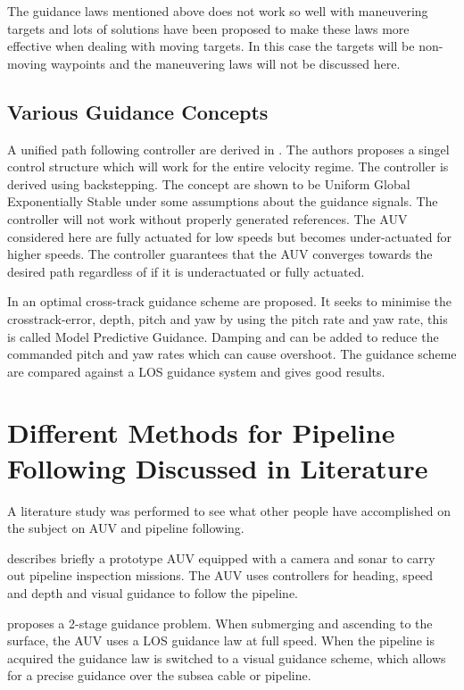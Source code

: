         	The guidance laws mentioned above does not work so well with maneuvering targets and lots of
		solutions have been proposed to make these laws more effective when dealing with moving
		targets. In this case the targets will be non-moving waypoints and the maneuvering laws
		will not be discussed here.
		
	\subsection{Various Guidance Concepts}
		A unified path following controller are derived in \cite{control-concept-AUV}. The 
		authors proposes a singel control structure which will work for the entire velocity regime.
		The controller is derived using backstepping. The concept are shown to be Uniform Global
		Exponentially Stable under some assumptions about the guidance signals. The controller will
not
		work without properly generated references. The AUV considered here are fully actuated for low
		speeds but becomes under-actuated for higher speeds. The controller guarantees that the AUV
		converges towards the desired path regardless of if it is underactuated or fully actuated.
		
		In \cite{optimal-cross-track} an optimal cross-track guidance scheme are proposed. It seeks to
		minimise the crosstrack-error, depth, pitch and yaw by using the pitch rate and yaw rate, this
		is called Model	Predictive Guidance. Damping and can be added to reduce the commanded
		pitch and yaw rates which can cause overshoot. The guidance scheme are compared against a LOS
		guidance system and gives good results.
	
	
\section{Different Methods for Pipeline Following Discussed in Literature}
	A literature study was performed to see what other people have accomplished on the subject on AUV and 
	pipeline following. 

	\cite{piscis} describes briefly a prototype AUV equipped with a camera and sonar to carry out pipeline
	inspection missions. The AUV uses controllers for heading, speed and depth and visual guidance to
	follow the pipeline. 
	
	\cite{GuidanceReview} proposes a 2-stage guidance problem. When submerging and ascending to the surface, 
	the AUV uses a LOS guidance law at full speed. When the pipeline is acquired the guidance law is
switched 
	to a visual guidance scheme, which allows for a precise guidance over the subsea cable or pipeline. 
		
